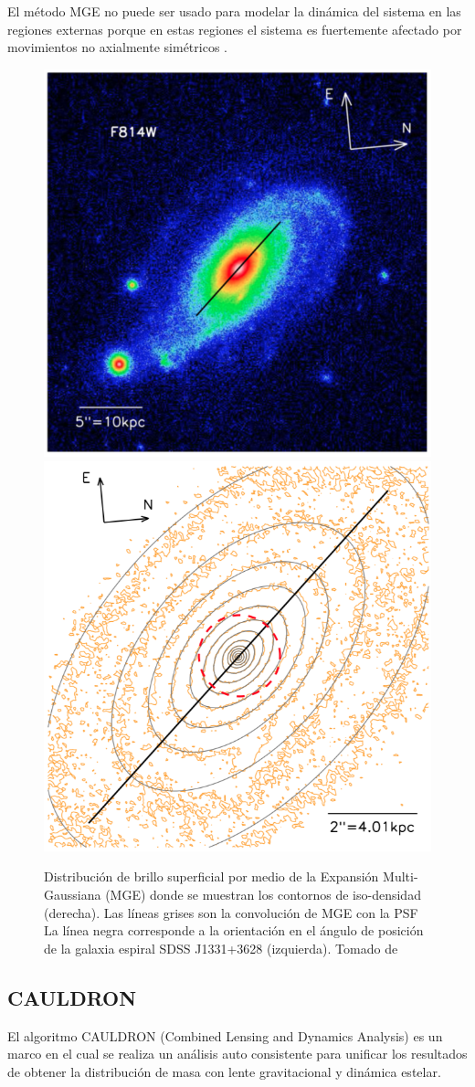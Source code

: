 El método MGE no puede ser usado para modelar la dinámica del sistema en las regiones externas porque en estas regiones el sistema es fuertemente afectado por movimientos no axialmente simétricos \cite{TR16}.

\begin{figure}
  \centering
  \includegraphics[width=0.45\columnwidth]{Kap2/J1331.png}
  \includegraphics[width=0.45\columnwidth]{Kap2/MGE_1.png}
  \caption{Distribución de brillo superficial  por medio de la Expansión Multi-Gaussiana (MGE) donde se muestran los contornos de iso-densidad (derecha). Las líneas grises son la convolución de MGE con la PSF La línea negra corresponde a la orientación en el ángulo de posición de la galaxia espiral SDSS J1331+3628 (izquierda). Tomado de \cite{TR16}  }
  \label{fig:Fi4}
\end{figure}


\subsection{CAULDRON}

El algoritmo CAULDRON (Combined Lensing and Dynamics Analysis) es un marco en el cual se realiza un análisis auto consistente para unificar los resultados de obtener la distribución de masa con lente gravitacional y dinámica estelar. \cite{2007ApJ...666..726B}









